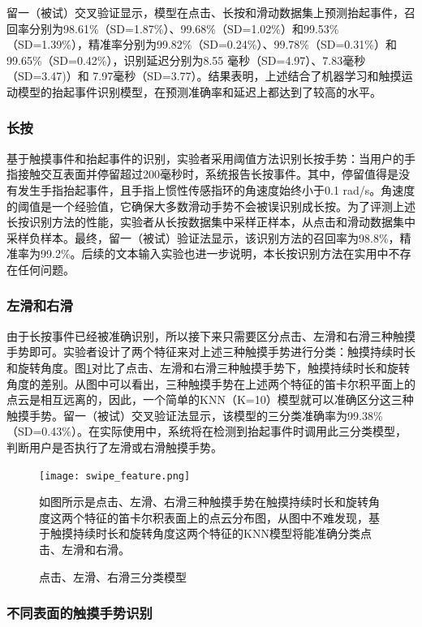 留一（被试）交叉验证显示，模型在点击、长按和滑动数据集上预测抬起事件，召回率分别为98.61\%（SD=1.87\%）、99.68\%（SD=1.02\%）和99.53\%（SD=1.39\%），精准率分别为99.82\%（SD=0.24\%）、99.78\%（SD=0.31\%）和99.65\%（SD=0.42\%），识别延迟分别为8.55 毫秒（SD=4.97）、7.83毫秒（SD=3.47)）和 7.97毫秒（SD=3.77）。结果表明，上述结合了机器学习和触摸运动模型的抬起事件识别模型，在预测准确率和延迟上都达到了较高的水平。

\subsubsection{长按}

基于触摸事件和抬起事件的识别，实验者采用阈值方法识别长按手势：当用户的手指接触交互表面并停留超过200毫秒时，系统报告长按事件。其中，停留值得是没有发生手指抬起事件，且手指上惯性传感指环的角速度始终小于0.1 rad/s。角速度的阈值是一个经验值，它确保大多数滑动手势不会被误识别成长按。为了评测上述长按识别方法的性能，实验者从长按数据集中采样正样本，从点击和滑动数据集中采样负样本。最终，留一（被试）验证法显示，该识别方法的召回率为98.8\%，精准率为99.2\%。后续的文本输入实验也进一步说明，本长按识别方法在实用中不存在任何问题。

\subsubsection{左滑和右滑}

由于长按事件已经被准确识别，所以接下来只需要区分点击、左滑和右滑三种触摸手势即可。实验者设计了两个特征来对上述三种触摸手势进行分类：触摸持续时长和旋转角度。图\ref{fig:swipe_feature}对比了点击、左滑和右滑三种触摸手势下，触摸持续时长和旋转角度的差别。从图中可以看出，三种触摸手势在上述两个特征的笛卡尔积平面上的点云是相互远离的，因此，一个简单的KNN（K=10）模型就可以准确区分这三种触摸手势。留一（被试）交叉验证法显示，该模型的三分类准确率为99.38\%（SD=0.43\%）。在实际使用中，系统将在检测到抬起事件时调用此三分类模型，判断用户是否执行了左滑或右滑触摸手势。

\begin{figure}
	\centering
	\texttt{[image: swipe\_feature.png]}
	\caption*{如图所示是点击、左滑、右滑三种触摸手势在触摸持续时长和旋转角度这两个特征的笛卡尔积表面上的点云分布图，从图中不难发现，基于触摸持续时长和旋转角度这两个特征的KNN模型将能准确分类点击、左滑和右滑。}
	\caption{点击、左滑、右滑三分类模型}
	\label{fig:swipe_feature}
\end{figure}

\subsubsection{不同表面的触摸手势识别}

